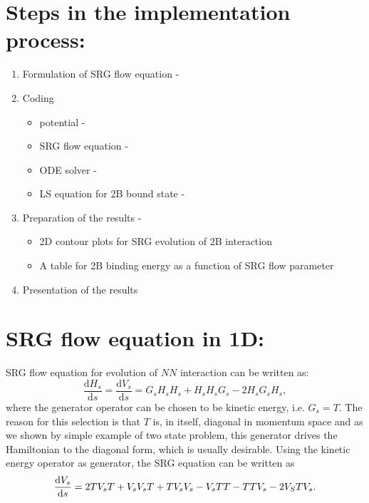 \documentclass[aps,prc,preprint,groupedaddress]{revtex4-1}
\newcommand{\dd}[2]{\ensuremath{\frac{\mathrm{d}#1}{\mathrm{d}#2}}}
\newcommand{\rd}{\ensuremath{\hbox{d}}}
\begin{document}
\section{Steps in the implementation process:}

\begin{enumerate}
\item Formulation of SRG flow equation - {\color{red}{Hadi}}
\item Coding
\begin{itemize}
\item potential - {\color{red}{Sudhanva}}
\item SRG flow equation  - {\color{red}{Arbin}}
\item ODE solver - {\color{red}{Linda}}
\item LS equation for 2B bound state - {\color{red}{Sudhanva}}
\end{itemize}

\item Preparation of the results - {\color{red}{Mamun}}
\begin{itemize}
\item 2D contour plots for SRG evolution of 2B interaction
\item A table for 2B binding energy as a function of SRG flow parameter 
\end{itemize}

\item Presentation of the results
\end{enumerate}
	
	

\section{SRG flow equation in 1D:}

SRG flow equation for evolution of $NN$ interaction can be written as:
\begin{equation}
\label{eq:srg-general}
\dd{H_s}{s} = \dd{V_s}{s}=G_sH_sH_s+H_sH_sG_s-2H_sG_sH_s,
\end{equation}
where the generator operator can be chosen to be kinetic energy, i.e. $G_s=T$. The reason for this selection is that $T$ is, in itself, diagonal in momentum space and as we shown by simple example of two state problem, this generator drives the Hamiltonian to the diagonal form, which is usually desirable. 
Using the kinetic energy operator as generator, the SRG equation can be written as
\begin{equation}
\label{eq:srg}
\frac{\rd V_s}{\rd s} = 2TV_sT + V_sV_sT + TV_sV_s - V_sTT - TTV_s -
2V_STV_s .
\end{equation}
\end{document}
